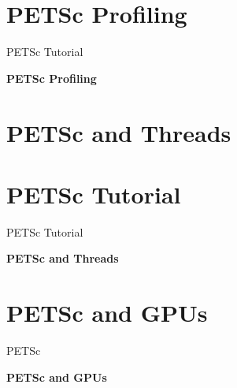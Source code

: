 






%
%
\section{PETSc Profiling}
\begin{frame}{PETSc Tutorial}
   \begin{center} \Large \textbf{PETSc Profiling} \end{center}
\end{frame}









%
%
\section{PETSc and Threads}

\section{PETSc Tutorial}
\begin{frame}{PETSc Tutorial}
   \begin{center} \Large \textbf{PETSc and Threads} \end{center}
\end{frame}





%
%
\section{PETSc and GPUs}
\begin{frame}{PETSc}
   \begin{center} \Large \textbf{PETSc and GPUs} \end{center}
\end{frame}








